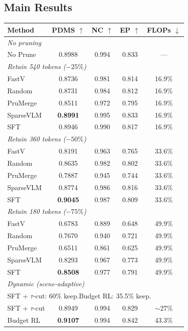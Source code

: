 \documentclass[letterpaper]{article} %
\begin{document}

\subsection{Main Results}
\label{sec:main}

\newcommand{\best}[1]{\textbf{#1}}
\begin{table}[t]
\centering
{\small
\setlength{\tabcolsep}{1mm}
\begin{tabular}{@{}lcccc@{}}
\toprule
Method & PDMS $\uparrow$ & NC $\uparrow$ & EP $\uparrow$ & FLOPs $\downarrow$ \\
\midrule
\multicolumn{5}{l}{\emph{No pruning}} \\
No Prune & 0.8988 & 0.994 & 0.833 & --- \\
\midrule
\multicolumn{5}{l}{\emph{Retain 540 tokens ($-25\%$)}} \\
FastV~\citep{chen2024fastv}      & 0.8736 & 0.981 & 0.814 & 16.9\% \\
Random     & 0.8731 & 0.984 & 0.812 & 16.9\% \\
PruMerge~\citep{shang2024llavaprumerge}   & 0.8511 & 0.972 & 0.795 & 16.9\% \\
SparseVLM~\citep{xu2024sparsevlm}  & \best{0.8991} & 0.995 & 0.833 & 16.9\% \\
\ours{} SFT & 0.8946 & 0.990 & 0.817 & 16.9\% \\
\midrule
\multicolumn{5}{l}{\emph{Retain 360 tokens ($-50\%$)}} \\
FastV~\citep{chen2024fastv}      & 0.8191 & 0.963 & 0.765 & 33.6\% \\
Random     & 0.8635 & 0.982 & 0.802 & 33.6\% \\
PruMerge~\citep{shang2024llavaprumerge}   & 0.7887 & 0.945 & 0.744 & 33.6\% \\
SparseVLM~\citep{xu2024sparsevlm}  & 0.8774 & 0.986 & 0.816 & 33.6\% \\
\ours{} SFT & \best{0.9045} & 0.987 & 0.809 & 33.6\% \\
\midrule
\multicolumn{5}{l}{\emph{Retain 180 tokens ($-75\%$)}} \\
FastV~\citep{chen2024fastv}      & 0.6783 & 0.889 & 0.648 & 49.9\% \\
Random     & 0.7670 & 0.940 & 0.721 & 49.9\% \\
PruMerge~\citep{shang2024llavaprumerge}   & 0.6511 & 0.861 & 0.625 & 49.9\% \\
SparseVLM~\citep{xu2024sparsevlm}  & 0.8293 & 0.967 & 0.773 & 49.9\% \\
\ours{} SFT & \best{0.8508} & 0.977 & 0.791 & 49.9\% \\
\midrule
\multicolumn{5}{l}{\emph{Dynamic (scene-adaptive)}} \\
\multicolumn{5}{l}{\small SFT + $\tau$-cut: 60\% keep.\quad Budget RL: 35.5\% keep.} \\
\ours{} SFT + $\tau$-cut & 0.8949 & 0.994 & 0.829 & $\sim$27\% \\
\ours{} Budget RL        & \best{0.9107} & 0.994 & 0.842 & 43.3\% \\
\bottomrule
\end{tabular}

}
\end{table}
\end{document}
